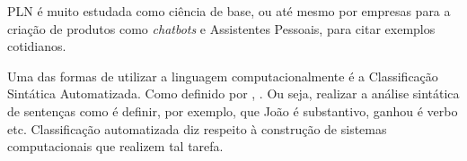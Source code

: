 PLN é muito estudada como ciência de base, ou até mesmo por empresas para a criação de produtos como \textit{chatbots} e Assistentes Pessoais, para citar exemplos cotidianos. 


Uma das formas de utilizar a linguagem computacionalmente é a Classificação Sintática Automatizada. Como definido por , .
Ou seja, realizar a análise sintática de sentenças como  é definir, por exemplo, que João é substantivo, ganhou é verbo etc. Classificação automatizada diz respeito à construção de sistemas computacionais que realizem tal tarefa.

